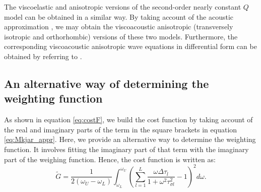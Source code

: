 \documentclass[article]{./macros/elsarticle_qh}
\begin{document}
The viscoelastic and anisotropic versions of the second-order nearly constant $Q$ model can be obtained in a similar way. By taking account of the acoustic approximation \cite[]{hao.alkhalifah:2019}, we may obtain the viscoacoustic anisotropic (transversely isotropic and orthorhombic) versions of these two models. Furthermore, the corresponding viscoacoustic anisotropic wave equations in differential form can be obtained by referring to \cite{hao.greenhalgh:2019}.

\subsection{An alternative way of determining the weighting function}
As shown in equation \ref{eq:costF}, we build the cost function by taking account of the real and imaginary parts of the term in the square brackets in equation \ref{eq:Mkjar_appr}. Here, we provide an alternative way to determine the weighting function. It involves fitting the imaginary part of that term with the imaginary part of the weighing function. Hence, the cost function is written as: 
\begin{equation} \label{eq:costF2}
\displaystyle
\tilde{G} = \frac{1}{2(\omega_{U}-\omega_{L})} \int_{\omega_{L}}^{\omega_{U}} 
\left(
\sum_{l=1}^{L}
\frac{\omega \Delta \tau_{l}}{1+\omega^2 \tau_{\sigma l}^2} - 1
\right)^2 
d\omega .
\end{equation} 
\end{document}
